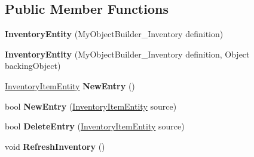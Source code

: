 \subsection*{Public Member Functions}
\begin{DoxyCompactItemize}
\item 
\hypertarget{class_s_e_mod_a_p_i_internal_1_1_a_p_i_1_1_entity_1_1_inventory_entity_a3f3ff0b821fa554ea0bc89fde3155f3e}{}{\bfseries Inventory\+Entity} (My\+Object\+Builder\+\_\+\+Inventory definition)\label{class_s_e_mod_a_p_i_internal_1_1_a_p_i_1_1_entity_1_1_inventory_entity_a3f3ff0b821fa554ea0bc89fde3155f3e}

\item 
\hypertarget{class_s_e_mod_a_p_i_internal_1_1_a_p_i_1_1_entity_1_1_inventory_entity_aa633c9c23ad7a78ea4d42ea574d286c9}{}{\bfseries Inventory\+Entity} (My\+Object\+Builder\+\_\+\+Inventory definition, Object backing\+Object)\label{class_s_e_mod_a_p_i_internal_1_1_a_p_i_1_1_entity_1_1_inventory_entity_aa633c9c23ad7a78ea4d42ea574d286c9}

\item 
\hypertarget{class_s_e_mod_a_p_i_internal_1_1_a_p_i_1_1_entity_1_1_inventory_entity_a08e4faa0731fba6e420fe986e274ccdf}{}\hyperlink{class_s_e_mod_a_p_i_internal_1_1_a_p_i_1_1_entity_1_1_inventory_item_entity}{Inventory\+Item\+Entity} {\bfseries New\+Entry} ()\label{class_s_e_mod_a_p_i_internal_1_1_a_p_i_1_1_entity_1_1_inventory_entity_a08e4faa0731fba6e420fe986e274ccdf}

\item 
\hypertarget{class_s_e_mod_a_p_i_internal_1_1_a_p_i_1_1_entity_1_1_inventory_entity_ae718bbe9b412bd24e21ae4ff63f703cd}{}bool {\bfseries New\+Entry} (\hyperlink{class_s_e_mod_a_p_i_internal_1_1_a_p_i_1_1_entity_1_1_inventory_item_entity}{Inventory\+Item\+Entity} source)\label{class_s_e_mod_a_p_i_internal_1_1_a_p_i_1_1_entity_1_1_inventory_entity_ae718bbe9b412bd24e21ae4ff63f703cd}

\item 
\hypertarget{class_s_e_mod_a_p_i_internal_1_1_a_p_i_1_1_entity_1_1_inventory_entity_ad9471c952892a871c3e21a4ff99ea1de}{}bool {\bfseries Delete\+Entry} (\hyperlink{class_s_e_mod_a_p_i_internal_1_1_a_p_i_1_1_entity_1_1_inventory_item_entity}{Inventory\+Item\+Entity} source)\label{class_s_e_mod_a_p_i_internal_1_1_a_p_i_1_1_entity_1_1_inventory_entity_ad9471c952892a871c3e21a4ff99ea1de}

\item 
\hypertarget{class_s_e_mod_a_p_i_internal_1_1_a_p_i_1_1_entity_1_1_inventory_entity_a6f77a8c46be13a75e1a18551574ed3d2}{}void {\bfseries Refresh\+Inventory} ()\label{class_s_e_mod_a_p_i_internal_1_1_a_p_i_1_1_entity_1_1_inventory_entity_a6f77a8c46be13a75e1a18551574ed3d2}


\end{DoxyCompactItemize}
